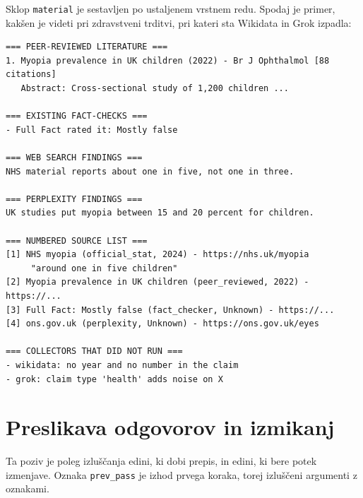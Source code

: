\documentclass[a4paper, 12pt]{book}
\begin{document}
Sklop \texttt{material} je sestavljen po ustaljenem vrstnem redu. Spodaj je
primer, kakšen je videti pri zdravstveni trditvi, pri kateri sta Wikidata in
Grok izpadla:

\begin{lstlisting}[basicstyle=\ttfamily\scriptsize,breaklines=true]
=== PEER-REVIEWED LITERATURE ===
1. Myopia prevalence in UK children (2022) - Br J Ophthalmol [88 citations]
   Abstract: Cross-sectional study of 1,200 children ...

=== EXISTING FACT-CHECKS ===
- Full Fact rated it: Mostly false

=== WEB SEARCH FINDINGS ===
NHS material reports about one in five, not one in three.

=== PERPLEXITY FINDINGS ===
UK studies put myopia between 15 and 20 percent for children.

=== NUMBERED SOURCE LIST ===
[1] NHS myopia (official_stat, 2024) - https://nhs.uk/myopia
     "around one in five children"
[2] Myopia prevalence in UK children (peer_reviewed, 2022) - https://...
[3] Full Fact: Mostly false (fact_checker, Unknown) - https://...
[4] ons.gov.uk (perplexity, Unknown) - https://ons.gov.uk/eyes

=== COLLECTORS THAT DID NOT RUN ===
- wikidata: no year and no number in the claim
- grok: claim type 'health' adds noise on X
\end{lstlisting}


\section{Preslikava odgovorov in izmikanj}
\label{app:poziv-zavrnitve}

Ta poziv je poleg izluščanja edini, ki dobi prepis, in edini, ki bere potek
izmenjave. Oznaka \texttt{prev\_pass} je izhod
prvega koraka, torej izluščeni argumenti z oznakami.
\end{document}
